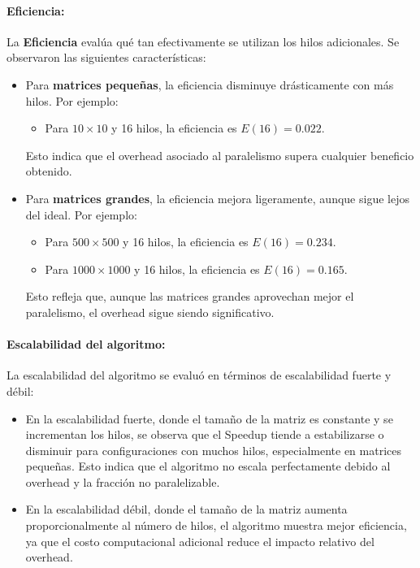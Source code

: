 \documentclass{article}
\begin{document}
\paragraph{Eficiencia:} 
La \textbf{Eficiencia} evalúa qué tan efectivamente se utilizan los hilos adicionales. Se observaron las siguientes características:
\begin{itemize}
    \item Para \textbf{matrices pequeñas}, la eficiencia disminuye drásticamente con más hilos. Por ejemplo:
    \begin{itemize}
        \item Para \(10 \times 10\) y 16 hilos, la eficiencia es \(E(16) = 0.022\).
    \end{itemize}
    Esto indica que el overhead asociado al paralelismo supera cualquier beneficio obtenido.
    \item Para \textbf{matrices grandes}, la eficiencia mejora ligeramente, aunque sigue lejos del ideal. Por ejemplo:
    \begin{itemize}
        \item Para \(500 \times 500\) y 16 hilos, la eficiencia es \(E(16) = 0.234\).
        \item Para \(1000 \times 1000\) y 16 hilos, la eficiencia es \(E(16) = 0.165\).
    \end{itemize}
    Esto refleja que, aunque las matrices grandes aprovechan mejor el paralelismo, el overhead sigue siendo significativo.
\end{itemize}

\paragraph{Escalabilidad del algoritmo:}
La escalabilidad del algoritmo se evaluó en términos de escalabilidad fuerte y débil:
\begin{itemize}
    \item En la escalabilidad fuerte, donde el tamaño de la matriz es constante y se incrementan los hilos, se observa que el Speedup tiende a estabilizarse o disminuir para configuraciones con muchos hilos, especialmente en matrices pequeñas. Esto indica que el algoritmo no escala perfectamente debido al overhead y la fracción no paralelizable.
    \item En la escalabilidad débil, donde el tamaño de la matriz aumenta proporcionalmente al número de hilos, el algoritmo muestra mejor eficiencia, ya que el costo computacional adicional reduce el impacto relativo del overhead.
\end{itemize}
\end{document}

